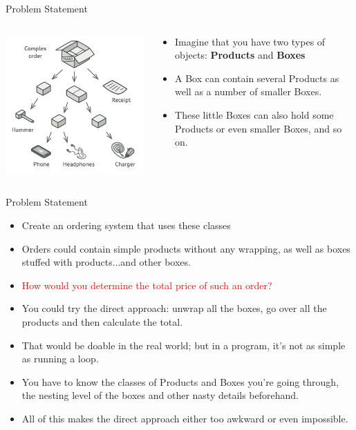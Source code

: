 \documentclass[13pt]{beamer}
\begin{document}
\begin{frame}{Problem Statement}
	\begin{columns}[T]
		\begin{column}{.45\textwidth}
			\includegraphics[scale=0.4]{./images/problem.png}
		\end{column}
	
		\begin{column}{.45\textwidth}
			\begin{itemize}
				\item Imagine that you have two types of objects: \textbf{Products} and \textbf{Boxes}
				\item A Box can contain several Products as well as a number of smaller Boxes.
				\item These little Boxes can also hold some Products or even smaller Boxes, and so on.
			\end{itemize}
		\end{column}
	\end{columns}
\end{frame}

\begin{frame}{Problem Statement}
	\begin{itemize}
		\item Create an ordering system that uses these classes
		\item Orders could contain simple products without any wrapping, as well as boxes stuffed with products...and other boxes.
		\item \textcolor{red}{How would you determine the total price of such an order?}
		\item You could try the direct approach: unwrap all the boxes, go over all the products and then calculate the total.
		\item That would be doable in the real world; but in a program, it’s not as simple as running a loop.
		\item You have to know the classes of Products and Boxes you’re going through, the nesting level of the boxes and other nasty details beforehand.
		\item All of this makes the direct approach either too awkward or even impossible.
	\end{itemize}
\end{frame}
\end{document}
